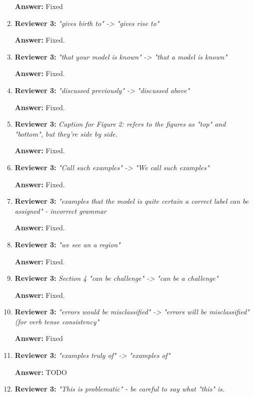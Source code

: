 \documentclass[letterpaper]{article}
\begin{document}
\begin{enumerate}
\textbf{Answer:} Fixed

\item \textbf{Reviewer 3:} \emph{ "gives birth to" -> "gives rise to"}

\textbf{Answer:} Fixed.

\item \textbf{Reviewer 3:} \emph{ "that your model is known" -> "that a model is known"}

\textbf{Answer:} Fixed.

\item \textbf{Reviewer 3:} \emph{ "discussed previously" -> "discussed above"}

\textbf{Answer:} Fixed.

\item \textbf{Reviewer 3:} \emph{ Caption for Figure 2: refers to the figures as "top" and "bottom", but they're side by side.}

\textbf{Answer:} Fixed.

\item \textbf{Reviewer 3:} \emph{ "Call such examples" -> "We call such examples"}

\textbf{Answer:} Fixed.

\item \textbf{Reviewer 3:} \emph{ "examples that the model is quite certain a correct label can be assigned" - incorrect grammar}

\textbf{Answer:} Fixed.

\item \textbf{Reviewer 3:} \emph{ "we see an a region"}

\textbf{Answer:} Fixed.

\item \textbf{Reviewer 3:} \emph{ Section 4 "can be challenge" -> "can be a challenge"}

\textbf{Answer:} Fixed.

\item \textbf{Reviewer 3:} \emph{ "errors would be misclassified" -> "errors will be misclassified" (for verb tense consistency"}

\textbf{Answer:} Fixed

\item \textbf{Reviewer 3:} \emph{ "examples truly of" -> "examples of"}

\textbf{Answer:} TODO

\item \textbf{Reviewer 3:} \emph{ "This is problematic" - be careful to say what "this" is.}


\end{enumerate}
\end{document}
